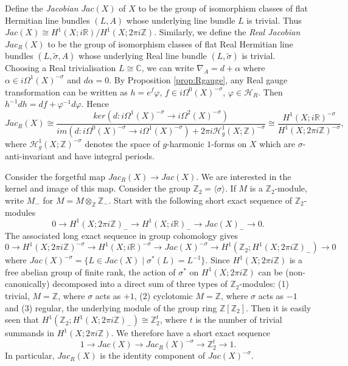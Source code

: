 \documentclass{amsart}
\theoremstyle{definition}
\theoremstyle{remark}
\numberwithin{equation}{section}
\begin{document}
Define the {\em Jacobian} $Jac(X)$ of $X$ to be the group of isomorphism classes of flat Hermitian line bundles $(L,A)$ whose underlying line bundle $L$ is trivial. Thus $Jac(X) \cong H^1(X ; i\mathbb{R})/H^1(X ; 2\pi i \mathbb{Z})$. Similarly, we define the {\em Real Jacobian} $Jac_R(X)$ to be the group of isomorphism classes of flat Real Hermitian line bundles $(L , \widetilde{\sigma} , A)$ whose underlying Real line bundle $(L , \widetilde{\sigma})$ is trivial. Choosing a Real trivialisation $L \cong \mathbb{C}$, we can write $\nabla_A = d + \alpha$ where $\alpha \in i\Omega^1(X)^{-\sigma}$ and $d\alpha = 0$. By Proposition \ref{prop:Rgauge}, any Real gauge transformation can be written as $h = e^{f} \varphi$, $f \in i \Omega^0(X)^{-\sigma}$, $\varphi \in \mathcal{H}_R$. Then $h^{-1}dh = df + \varphi^{-1}d\varphi$. Hence
\[
Jac_R(X) \cong \frac{ ker( d : i\Omega^1(X)^{-\sigma} \to i\Omega^2(X)^{-\sigma} ) }{ im( d : i\Omega^0(X)^{-\sigma} \to i\Omega^1(X)^{-\sigma} )  + 2 \pi i \mathcal{H}^1_g(X ; \mathbb{Z})^{-\sigma} } \cong \frac{ H^1(X ; i \mathbb{R})^{-\sigma} }{ H^1(X ; 2\pi i \mathbb{Z})^{-\sigma} },
\]
where $\mathcal{H}^1_g(X ; \mathbb{Z})^{-\sigma}$ denotes the space of $g$-harmonic $1$-forms on $X$ which are $\sigma$-anti-invariant and have integral periods.

Consider the forgetful map $Jac_R(X) \to Jac(X)$. We are interested in the kernel and image of this map. Consider the group $\mathbb{Z}_2 = \langle \sigma \rangle$. If $M$ is a $\mathbb{Z}_2$-module, write $M_-$ for $M = M \otimes_{\mathbb{Z}} \mathbb{Z}_-$. Start with the following short exact sequence of $\mathbb{Z}_2$-modules
\[
0 \to H^1(X ; 2 \pi i \mathbb{Z} )_- \to H^1(X ; i \mathbb{R})_- \to Jac(X)_- \to 0.
\]
The associated long exact sequence in group cohomology gives
\[
0 \to H^1(X ; 2\pi i \mathbb{Z})^{-\sigma} \to H^1(X ; i \mathbb{R})^{-\sigma} \to Jac(X)^{-\sigma} \to H^1(\mathbb{Z}_2 ; H^1(X ; 2\pi i \mathbb{Z})_- ) \to 0
\]
where $Jac(X)^{-\sigma} = \{ L \in Jac(X) \; | \; \sigma^*(L) = L^{-1} \}$. Since $H^1(X ; 2 \pi i \mathbb{Z})$ is a free abelian group of finite rank, the action of $\sigma^*$ on $H^1(X ; 2 \pi i \mathbb{Z})$ can be (non-canonically) decomposed into a direct sum of three types of $\mathbb{Z}_2$-modules: (1) trivial, $M = \mathbb{Z}$, where $\sigma$ acts as $+1$, (2) cyclotomic $M = \mathbb{Z}$, where $\sigma$ acts as $-1$ and (3) regular, the underlying module of the group ring $\mathbb{Z}[\mathbb{Z}_2]$. Then it is easily seen that $H^1(\mathbb{Z}_2 ; H^1( X ; 2 \pi i \mathbb{Z})_-) \cong \mathbb{Z}_2^t$, where $t$ is the number of trivial summands in $H^1(X ; 2 \pi i \mathbb{Z})$. We therefore have a short exact sequence
\[
1 \to Jac(X) \to Jac_R(X)^{-\sigma} \to \mathbb{Z}_2^t \to 1.
\]
In particular, $Jac_R(X)$ is the identity component of $Jac(X)^{-\sigma}$.
\end{document}
